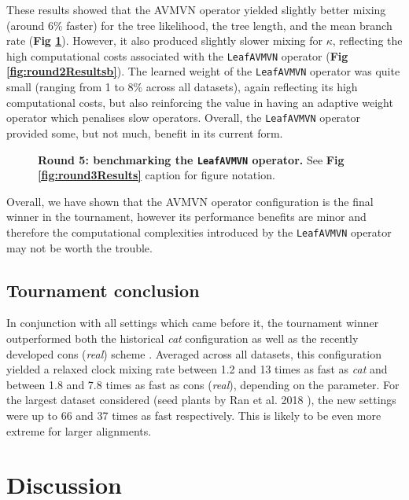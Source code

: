 \documentclass[10pt,letterpaper]{article}
\begin{document}
These results showed that the AVMVN operator yielded slightly better mixing (around 6\% faster) for the tree likelihood, the tree length, and the mean branch rate (\textbf{Fig \ref{fig:round5Results}}).
However, it also produced slightly slower mixing for $\kappa$, reflecting the high computational costs associated with the \texttt{LeafAVMVN} operator (\textbf{Fig \ref{fig:round2Resultsb}}).
The learned weight of the \texttt{LeafAVMVN} operator was quite small (ranging from 1 to 8\% across all datasets), again reflecting its high computational costs, but also reinforcing the value in having an adaptive weight operator which penalises slow operators.
Overall, the \texttt{LeafAVMVN} operator provided some, but not much, benefit in its current form. 


\begin{figure}[!h]
\caption{\textbf{Round 5: benchmarking the \texttt{LeafAVMVN} operator.} See \textbf{Fig \ref{fig:round3Results}} caption for figure notation.  }
\label{fig:round5Results}
\end{figure}



Overall, we have shown that the AVMVN operator configuration is the final winner in the tournament, however its performance benefits are minor and therefore the computational complexities introduced by the \texttt{LeafAVMVN} operator may not be worth the trouble.



\subsection*{Tournament conclusion}
 In conjunction with all settings which came before it, the tournament winner  outperformed both the historical \textit{cat} configuration \cite{drummond2006relaxed} as well as the recently developed cons (\textit{real}) scheme \cite{zhang2020improving}.
Averaged across all datasets, this configuration yielded a relaxed clock  mixing rate between 1.2 and 13 times as fast as \textit{cat} and between 1.8 and 7.8 times as fast as cons (\textit{real}), depending on the parameter.
For the largest dataset considered (seed plants by Ran et al. 2018 \cite{Ran_2018}), the new settings were up to 66 and 37 times as fast respectively.
This is likely to be even more extreme for larger alignments.



\section*{Discussion} \label{sect:discussion}
\end{document}

